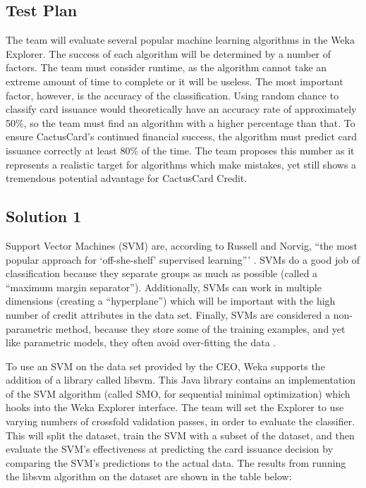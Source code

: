 \documentclass[11pt,journal]{IEEEtran}
\begin{document}
\subsection{Test Plan} \label{testplan}
The team will evaluate several popular machine learning algorithms in the Weka Explorer. The success of each algorithm will be determined by a number of factors. The team must consider runtime, as the algorithm cannot take an extreme amount of time to complete or it will be useless. The most important factor, however, is the accuracy of the classification. Using random chance to classify card issuance would theoretically have an accuracy rate of approximately 50\%, so the team must find an algorithm with a higher percentage than that. To ensure CactusCard's continued financial success, the algorithm must predict card issuance correctly at least 80\% of the time. The team proposes this number as it represents a realistic target for algorithms which make mistakes, yet still shows a tremendous potential advantage for CactusCard Credit.

\subsection{Solution 1}
Support Vector Machines (SVM) are, according to Russell and Norvig, ``the most popular approach for `off-she-shelf' supervised learning''' \cite{ai}. SVMs do a good job of classification because they separate groups as much as possible (called a ``maximum margin separator''). Additionally, SVMs can work in multiple dimensions (creating a ``hyperplane'') which will be important with the high number of credit attributes in the data set. Finally, SVMs are considered a non-parametric method, because they store some of the training examples, and yet like parametric models, they often avoid over-fitting the data \cite{ai}.
\par
To use an SVM on the data set provided by the CEO, Weka supports the addition of a library called libsvm. This Java library contains an implementation of the SVM algorithm (called SMO, for sequential minimal optimization) which hooks into the Weka Explorer interface. The team will set the Explorer to use varying numbers of crossfold validation passes, in order to evaluate the classifier. This will split the dataset, train the SVM with a subset of the dataset, and then evaluate the SVM's effectiveness at predicting the card issuance decision by comparing the SVM's predictions to the actual data. The results from running the libsvm algorithm on the dataset are shown in the table below:
\end{document}
